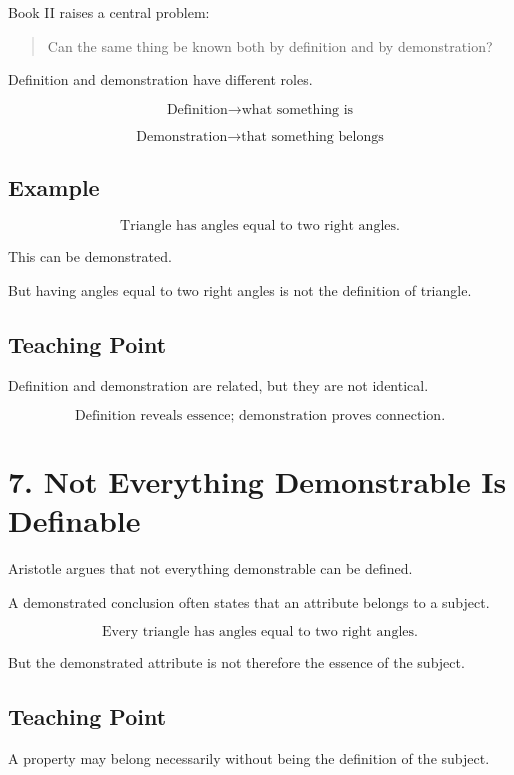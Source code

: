 \documentclass[12pt]{article}
\begin{document}
Book II raises a central problem:

\begin{quote}
Can the same thing be known both by definition and by demonstration?
\end{quote}

Definition and demonstration have different roles.

\[
\text{Definition} \rightarrow \text{what something is}
\]

\[
\text{Demonstration} \rightarrow \text{that something belongs}
\]

\subsection*{Example}

\[
\text{Triangle has angles equal to two right angles.}
\]

This can be demonstrated.

But having angles equal to two right angles is not the definition of triangle.

\subsection*{Teaching Point}

Definition and demonstration are related, but they are not identical.

\[
\boxed{
\text{Definition reveals essence; demonstration proves connection.}
}
\]

\section*{7. Not Everything Demonstrable Is Definable}

Aristotle argues that not everything demonstrable can be defined.

A demonstrated conclusion often states that an attribute belongs to a subject.

\[
\text{Every triangle has angles equal to two right angles.}
\]

But the demonstrated attribute is not therefore the essence of the subject.

\subsection*{Teaching Point}

A property may belong necessarily without being the definition of the subject.
\end{document}
